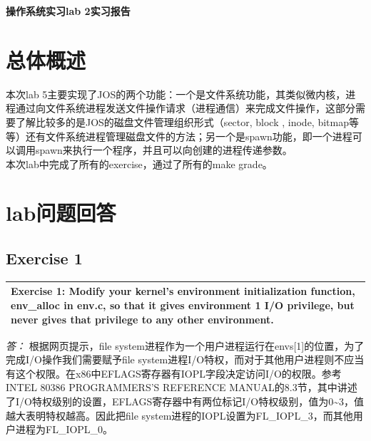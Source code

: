 \documentclass[11pt,a4paper]{article}
\newcommand{\exercise}[2]{
\begin{tabular}{|p{\textwidth}|}
\hline
#1: #2\\
\hline
\end{tabular}
\textit{\large{答：}}}
\begin{document}

\centerline{\Huge{\textbf{操作系统实习lab 2实习报告}}}
\tableofcontents
\thispagestyle{empty}

\section{总体概述}
本次lab 5主要实现了JOS的两个功能：一个是文件系统功能，其类似微内核，进程通过向文件系统进程发送文件操作请求（进程通信）来完成文件操作，这部分需要了解比较多的是JOS的磁盘文件管理组织形式（sector, block , inode, bitmap等等）还有文件系统进程管理磁盘文件的方法；另一个是spawn功能，即一个进程可以调用spawn来执行一个程序，并且可以向创建的进程传递参数。\\
本次lab中完成了所有的exercise，通过了所有的make grade。

\section{lab问题回答}
\subsection{Exercise 1}
\exercise{Exercise 1}{Modify your kernel's environment initialization function, env\_alloc in env.c, so that it gives environment 1 I/O privilege, but never gives that privilege to any other environment. }
根据网页提示，file system进程作为一个用户进程运行在envs[1]的位置，为了完成I/O操作我们需要赋予file system进程I/O特权，而对于其他用户进程则不应当有这个权限。在x86中EFLAGS寄存器有IOPL字段决定访问I/O的权限。参考INTEL 80386 PROGRAMMERS'S REFERENCE MANUAL的8.3节，其中讲述了I/O特权级别的设置，EFLAGS寄存器中有两位标记I/O特权级别，值为0\~{}3，值越大表明特权越高。因此把file system进程的IOPL设置为FL\_IOPL\_3，而其他用户进程为FL\_IOPL\_0。
\end{document}
